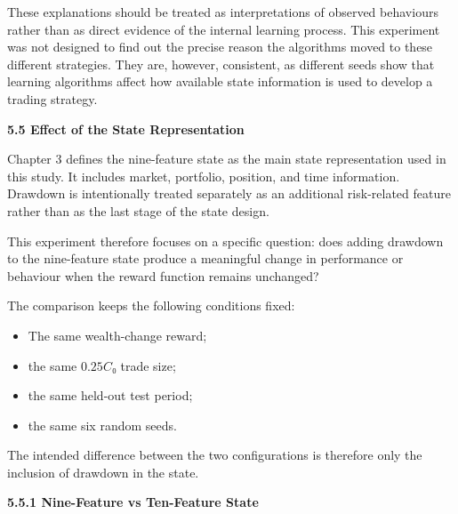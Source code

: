 These explanations should be treated as interpretations of observed
behaviours rather than as direct evidence of the internal learning
process. This experiment was not designed to find out the precise reason
the algorithms moved to these different strategies. They are, however,
consistent, as different seeds show that learning algorithms affect how
available state information is used to develop a trading strategy.

\textbf{5.5 Effect of the State Representation}

Chapter 3 defines the nine-feature state as the main state
representation used in this study. It includes market, portfolio,
position, and time information. Drawdown is intentionally treated
separately as an additional risk-related feature rather than as the last
stage of the state design.

This experiment therefore focuses on a specific question: does adding
drawdown to the nine-feature state produce a meaningful change in
performance or behaviour when the reward function remains unchanged?

The comparison keeps the following conditions fixed:

\begin{itemize}
\item
  The same wealth-change reward;
\item
  the same \(0.25C₀\) trade size;
\item
  the same held-out test period;
\item
  the same six random seeds.
\end{itemize}

The intended difference between the two configurations is therefore only
the inclusion of drawdown in the state.

\textbf{5.5.1 Nine-Feature vs Ten-Feature State}

